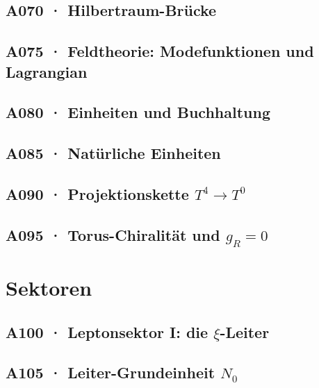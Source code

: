 \documentclass[11pt,twoside,openright]{book}
\begin{document}
\chapter[A070 · Hilbertraum-Brücke]{A070 · Hilbertraum-Brücke}


\chapter[A075 · Feldtheorie]{A075 · Feldtheorie: Modefunktionen und Lagrangian}


\chapter[A080 · Einheiten und Buchhaltung]{A080 · Einheiten und Buchhaltung}


\chapter[A085 · Natürliche Einheiten]{A085 · Natürliche Einheiten}


\chapter[A090 · Projektionskette $T^4\to T^0$]{A090 · Projektionskette $T^4\to T^0$}


\chapter[A095 · Torus-Chiralität]{A095 · Torus-Chiralität und $g_R=0$}


\part{Sektoren}

\chapter[A100 · Leptonsektor]{A100 · Leptonsektor I: die $\xi$-Leiter}


\chapter[A105 · Leiter-Grundeinheit $N_0$]{A105 · Leiter-Grundeinheit $N_0$}

\end{document}
